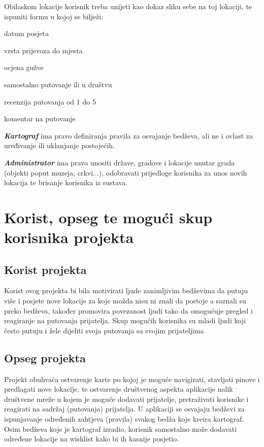 		
		Obilaskom lokacije korisnik treba unijeti kao dokaz sliku sebe na toj lokaciji, te ispuniti formu u kojoj se bilježi:
		\begin{packed_item}
		    \item{datum posjeta}
		    \item{vrsta prijevoza do mjesta}
		    \item{ocjena gužve}
		    \item{samostalno putovanje ili u društvu}
		    \item{recenzija putovanja od 1 do 5}
		    \item{komentar na putovanje}
		\end{packed_item}
		
		\textbf{\textit{Kartograf}} ima pravo definiranja pravila za osvajanje bedževa, ali ne i ovlast za uređivanje ili uklanjanje postojećih.
		
		\textbf{\textit{Administrator}} ima pravo unositi države, gradove i lokacije unutar grada (objekti poput muzeja, crkvi...), odobravati prijedloge korisnika za unos novih lokacija te brisanje korisnika iz sustava.
		
		\section{Korist, opseg te mogući skup korisnika projekta}
		\subsection{Korist projekta}
		Korist ovog projekta bi bila motivirati ljude zanimljivim bedževima da putuju više i posjete nove lokacije za koje možda nisu ni znali da postoje a saznali su preko bedževa, također promovira povezanost ljudi tako da omogućuje pregled i reagiranje na putovanja prijatelja.
		Skup mogućih korisnika su mladi ljudi koji često putuju i žele dijeliti svoja putovanja sa svojim prijateljima
		
		\subsection{Opseg projekta}
		Projekt obuhvaća ostvarenje karte po kojoj je moguće navigirati, stavljati pinove i predlagati nove lokacije, te ostvarenje društvenog aspekta aplikacije nalik društvene mreže u kojem je moguće dodavati prijatelje, pretraživati korisnike i reagirati na sadržaj (putovanja) prijatelja. U aplikaciji se osvajaju bedževi za ispunjavanje određenih zahtjeva (pravila) svakog bedža koje kreira kartograf. Osim bedževa koje je kartograf izradio, korisnik samostalno može dodavati određene lokacije na wishlist kako bi ih kasnije posjetio.
		
		
		\eject
		
	